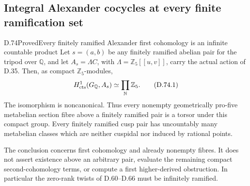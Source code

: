 \subsection{Integral Alexander cocycles at every finite ramification set}

\begin{statement}{D.74}{Proved}{Every finitely ramified Alexander first cohomology is an infinite countable product}
Let \(s=(a,b)\) be any finitely ramified abelian pair for the
tripod over \(\mathbb Q\), and let \(A_s=\Lambda C\), with
\(\Lambda=\mathbb Z_5[[u,v]]\), carry the actual action of D.35.
Then, as compact \(\mathbb Z_5\)-modules,
\[
 H^1_{\rm cts}(G_{\mathbb Q},A_s)
                  \simeq\prod_{\mathbb N}\mathbb Z_5.
                                                        \tag{D.74.1}
\]
The isomorphism is noncanonical. Thus every nonempty
geometrically pro-five metabelian section fibre above a
finitely ramified pair is a torsor under this compact group.
Every finitely ramified cusp pair has uncountably many
metabelian classes which are neither cuspidal nor induced
by rational points.

The conclusion concerns first cohomology and already nonempty
fibres. It does not assert existence above an arbitrary pair,
evaluate the remaining compact second-cohomology terms, or
compute a first higher-derived obstruction. In particular the
zero-rank twists of D.60--D.66 must be infinitely ramified.
\end{statement}

